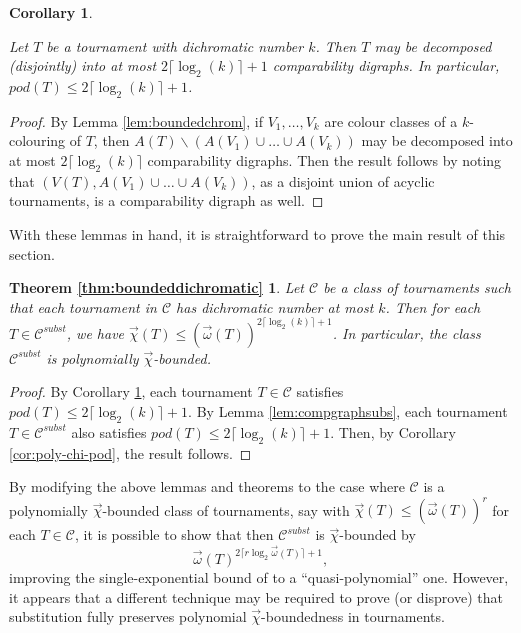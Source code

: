 \documentclass{article}
\newcommand{\dic}{\vec\chi}
\newcommand{\diomega}{\vec\omega}
\newcommand{\vomega}{\vec{\omega}}
\newcommand{\vchi}{\vec{\chi}}
\newtheorem{cor}[lemma]{Corollary}
\begin{document}
   \begin{cor}\label{cor:boundedchrom}

   Let $T$ be a tournament with dichromatic number $k$. Then $T$ may be decomposed (disjointly) into at most $2\lceil \log_2(k)\rceil+1$ comparability digraphs. In particular, $pod(T) \leq 2\lceil \log_2(k)\rceil+1$.
       
   \end{cor}

   \begin{proof}
By Lemma \ref{lem:boundedchrom}, if $V_1, \dots, V_k$ are colour classes of a $k$-colouring of $T$, then $A(T) \backslash (A(V_1) \cup \dots \cup  A(V_k))$ may be decomposed into at most $2\lceil \log_2(k)\rceil$ comparability digraphs. Then the result follows by noting that $(V(T), A(V_1) \cup \dots \cup A(V_k))$, as a disjoint union of acyclic tournaments, is a comparability digraph as well. \end{proof}


With these lemmas in hand, it is straightforward to prove the  main result of this section.
\newtheorem*{thm:boundeddichromatic}{Theorem \ref{thm:boundeddichromatic}}
\begin{thm:boundeddichromatic}
Let $\mathcal{C}$ be a class of tournaments such that each tournament in $\mathcal{C}$ has dichromatic number at most $k$. Then for each $T \in \mathcal{C}^{subst}$, we have  $\dic(T) \leq (\diomega(T))^{2\lceil \log_2(k) \rceil +1}$. In particular, the class $\mathcal{C}^{subst}$ is polynomially $\dic$-bounded. 
\end{thm:boundeddichromatic}

   \begin{proof}
       By Corollary \ref{cor:boundedchrom}, each tournament $T \in \mathcal{C}$ satisfies $pod(T) \leq 2\lceil \log_2(k) \rceil +1$. By Lemma \ref{lem:compgraphsubs}, each tournament $T \in \mathcal{C}^{subst}$ also satisfies $pod(T) \leq 2\lceil \log_2(k) \rceil +1$. Then, by Corollary \ref{cor:poly-chi-pod}, the result follows.
   \end{proof}
   

   By modifying the above lemmas and theorems to the case where $\mathcal{C}$ is a polynomially $\dic$-bounded class of tournaments, say with $\vchi(T) \leq (\vomega(T))^r$ for each $T \in \mathcal{C}$, it is possible to show that then $\mathcal{C}^{subst}$ is $\dic$-bounded by  $$\vomega(T)^{2\lceil r\log_2 \vomega(T) \rceil + 1},$$ improving the single-exponential bound of \cite{original} to a ``quasi-polynomial'' one. However, it appears that a different technique may be required to prove (or disprove) that substitution fully preserves polynomial $\dic$-boundedness in tournaments.
\end{document}
